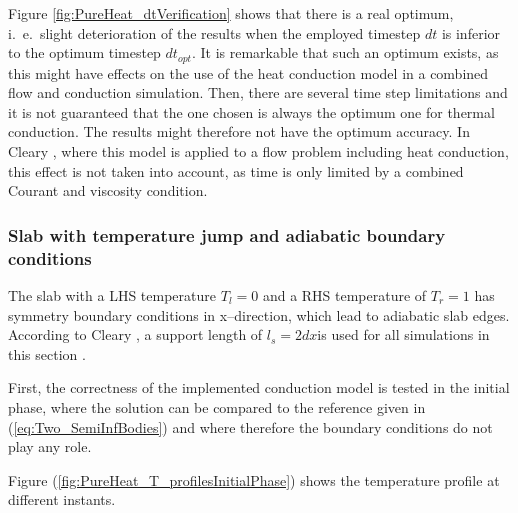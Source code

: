 \documentclass{report}
\begin{document}
Figure \ref{fig:PureHeat_dtVerification} shows that there is a real optimum, i.\ e.\ slight deterioration of the results when the employed timestep $dt$ is inferior to the optimum timestep $dt_\mathit{opt}$. %
It is remarkable that such an optimum exists, as this might have effects on the use of the heat conduction model in a combined flow and conduction simulation. Then, there are several time step limitations and it is not guaranteed that the one chosen is always the optimum one for thermal conduction. The results might therefore not have the optimum accuracy. In Cleary \cite{Cleary2002}, where this model is applied to a flow problem including heat conduction, this effect is not taken into account, as time is only limited by a combined Courant and viscosity condition.


\subsubsection{Slab with temperature jump and adiabatic boundary conditions}
\label{sec:Results_PureHeat_adiabaticBC}

The slab with a LHS temperature $T_l=0$ and a RHS temperature of $T_r=1$ has symmetry boundary conditions in x--direction, which lead to adiabatic slab edges.
According to Cleary \cite{Cleary1999}, a support length of $l_s=2dx$is used for all simulations in this section .

First, the correctness of the implemented conduction model is tested in the initial phase, where the solution can be compared to the reference given in (\ref{eq:Two_SemiInfBodies}) and where therefore the boundary conditions do not play any role.

Figure (\ref{fig:PureHeat_T_profilesInitialPhase}) shows the temperature profile at different instants.
\end{document}
